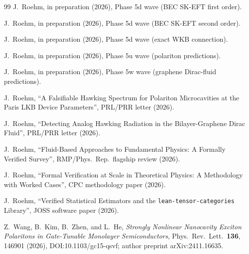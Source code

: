 \documentclass[aps,prd,reprint,nofootinbib,superscriptaddress]{revtex4-2}
\begin{document}
\begin{thebibliography}{99}
J.~Roehm, in preparation (2026), Phase 5d wave (BEC SK-EFT first
order).

J.~Roehm, in preparation (2026), Phase 5d wave (BEC SK-EFT second
order).

J.~Roehm, in preparation (2026), Phase 5d wave (exact WKB
connection).

J.~Roehm, in preparation (2026), Phase 5u wave (polariton
predictions).

J.~Roehm, in preparation (2026), Phase 5w wave (graphene Dirac-fluid
predictions).

J.~Roehm, ``A Falsifiable Hawking Spectrum for Polariton
Microcavities at the Paris LKB Device Parameters'', PRL/PRR letter
(2026).

J.~Roehm, ``Detecting Analog Hawking Radiation in the
Bilayer-Graphene Dirac Fluid'', PRL/PRR letter (2026).

J.~Roehm, ``Fluid-Based Approaches to Fundamental Physics: A
Formally Verified Survey'', RMP/Phys.~Rep.~flagship review (2026).

J.~Roehm, ``Formal Verification at Scale in Theoretical Physics:
A Methodology with Worked Cases'', CPC methodology paper (2026).

J.~Roehm, ``Verified Statistical Estimators and the
\texttt{lean-tensor-categories} Library'', JOSS software paper (2026).



Z.~Wang, B.~Kim, B.~Zhen, and L.~He,
\emph{Strongly Nonlinear Nanocavity Exciton Polaritons in Gate-Tunable
Monolayer Semiconductors},
Phys.~Rev.~Lett.~\textbf{136}, 146901 (2026),
DOI:10.1103/gc15-qsvf; author preprint arXiv:2411.16635.

\end{thebibliography}
\end{document}
